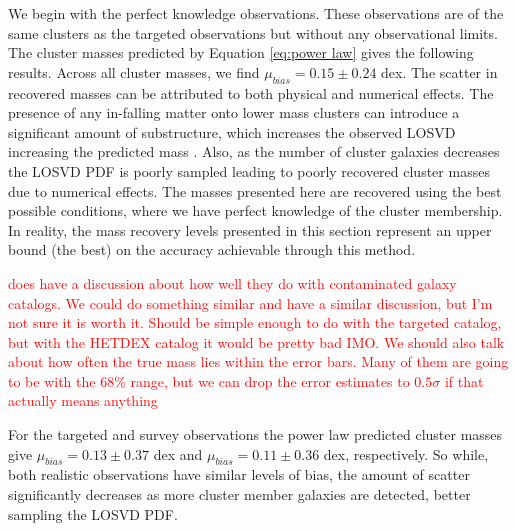 \documentclass[fleqn,usenatbib]{mnras}
\newcommand{\editorial}[1]{\textcolor{red}{#1}}
\begin{document}
We begin with the perfect knowledge observations. These observations are of the same clusters as the targeted observations but without any observational limits. The cluster masses predicted by Equation \ref{eq:power law} gives the following results. Across all cluster masses, we find $\mu_{bias} = 0.15\pm{0.24}$ dex. The scatter in recovered masses can be attributed to both physical and numerical effects. The presence of any in-falling matter onto lower mass clusters can introduce a significant amount of substructure, which increases the observed LOSVD increasing the predicted mass . Also, as the number of cluster galaxies decreases the LOSVD PDF is poorly sampled leading to poorly recovered cluster masses due to numerical effects. The masses presented here are recovered using the best possible conditions, where we have perfect knowledge of the cluster membership. In reality, the mass recovery levels presented in this section represent an upper bound (the best) on the accuracy achievable through this method.

\editorial{\cite{Ntampaka2015} does have a discussion about how well they do with contaminated galaxy catalogs. We could do something similar and have a similar discussion, but I'm not sure it is worth it. Should be simple enough to do with the targeted catalog, but with the HETDEX catalog it would be pretty bad IMO. We should also talk about how often the true mass lies within the error bars. Many of them are going to be with the 68\% range, but we can drop the error estimates to $0.5\sigma$ if that actually means anything} 

For the targeted and survey observations the power law predicted cluster masses give $\mu_{bias} =0.13\pm{0.37}$ dex and $\mu_{bias} =0.11\pm{0.36}$ dex, respectively. So while, both realistic observations have similar levels of bias, the amount of scatter significantly decreases as more cluster member galaxies are detected, better sampling the LOSVD PDF.
\end{document}

